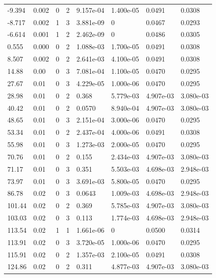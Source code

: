 \documentclass[preview]{standalone}
\begin{document}
{{\begin{tabular}{L{1.2cm}C{1.2cm} C{0.3cm}C{0.5cm} C{1.4cm}C{1.4cm} C{1.4cm}C{1.4cm}}
  -9.394  &  0.002  & 0     &  2 &  9.157e-04  & 1.400e-05  & 0.0491 &  0.0308   \\ 
  -8.717  &  0.002  & 1     &  3 &  3.881e-09  & 0  & 0.0467 &  0.0293   \\ 
  -6.614  &  0.001  & 1     &  2 &  2.462e-09  & 0  & 0.0486 &  0.0305   \\ 
  0.555  &  0.000  & 0     &  2 &  1.088e-03  & 1.700e-05  & 0.0491 &  0.0308   \\ 
  8.507  &  0.002  & 0     &  2 &  2.641e-03  & 4.100e-05  & 0.0491 &  0.0308   \\ 
  14.88  &  0.00  & 0     &  3 &  7.081e-04  & 1.100e-05  & 0.0470 &  0.0295   \\ 
  27.67  &  0.01  & 0     &  3 &  4.229e-05  & 1.000e-06  & 0.0470 &  0.0295   \\ 
  28.98  &  0.01  & 0     &  2 &  0.368  & 5.779e-03  & 4.907e-03 &  3.080e-03   \\ 
  40.42  &  0.01  & 0     &  2 &  0.0570  & 8.940e-04  & 4.907e-03 &  3.080e-03   \\ 
  48.65  &  0.01  & 0     &  3 &  2.151e-04  & 3.000e-06  & 0.0470 &  0.0295   \\ 
  53.34  &  0.01  & 0     &  2 &  2.437e-04  & 4.000e-06  & 0.0491 &  0.0308   \\ 
  55.98  &  0.01  & 0     &  3 &  1.273e-03  & 2.000e-05  & 0.0470 &  0.0295   \\ 
  70.76  &  0.01  & 0     &  2 &  0.155  & 2.434e-03  & 4.907e-03 &  3.080e-03   \\ 
  71.17  &  0.01  & 0     &  3 &  0.351  & 5.503e-03  & 4.698e-03 &  2.948e-03   \\ 
  73.97  &  0.01  & 0     &  3 &  3.691e-03  & 5.800e-05  & 0.0470 &  0.0295   \\ 
  86.78  &  0.02  & 0     &  3 &  0.0643  & 1.009e-03  & 4.698e-03 &  2.948e-03   \\ 
  101.44  &  0.02  & 0     &  2 &  0.369  & 5.785e-03  & 4.907e-03 &  3.080e-03   \\ 
  103.03  &  0.02  & 0     &  3 &  0.113  & 1.774e-03  & 4.698e-03 &  2.948e-03   \\ 
  113.54  &  0.02  & 1     &  1 &  1.661e-06  & 0  & 0.0500 &  0.0314   \\ 
  113.91  &  0.02  & 0     &  3 &  3.720e-05  & 1.000e-06  & 0.0470 &  0.0295   \\ 
  115.91  &  0.02  & 0     &  2 &  1.357e-03  & 2.100e-05  & 0.0491 &  0.0308   \\ 
  124.86  &  0.02  & 0     &  2 &  0.311  & 4.877e-03  & 4.907e-03 &  3.080e-03   \\ 

\end{tabular}}}
\end{document}
